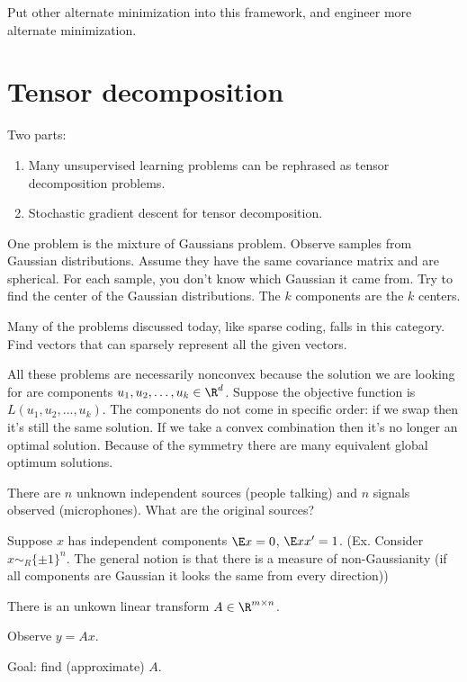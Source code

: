 Put other alternate minimization into this framework, and engineer more alternate minimization.


\section{Tensor decomposition}

Two parts:
\begin{enumerate}
\item
Many unsupervised learning problems can be rephrased as tensor decomposition problems. 
\item
Stochastic gradient descent for tensor decomposition.
\end{enumerate}

One problem is the mixture of Gaussians problem. Observe samples from Gaussian distributions. Assume they have the same covariance matrix and are spherical. For each sample, you don't know which Gaussian it came from. Try to find the center of the Gaussian distributions. The $k$ components are the $k$ centers. 

Many of the problems discussed today, like sparse coding, falls in this category. Find vectors that can sparsely represent all the given vectors.

All these problems are necessarily nonconvex because the solution we are looking for are components $u_1,u_2,\ldots, u_k\in \R^d$. Suppose the objective function is $L(u_1,u_2,\ldots, u_k)$. %
The components do not come in specific order: if we swap then it's still the same solution. If we take a convex combination then it's no longer an optimal solution. Because of the symmetry there are many equivalent global optimum solutions.


\begin{prb}
There are $n$ unknown independent sources (people talking) and $n$ signals observed (microphones). What are the original sources?

Suppose $x$ has independent components $\E x =0$, $\E xx'=1$. (Ex. Consider $x\sim_R \{\pm 1\}^n$. The general notion is that there is a measure of non-Gaussianity (if all components are Gaussian it looks the same from every direction))

There is an unkown linear transform $A\in \R^{m\times n}$. 

Observe $y=Ax$.

Goal: find (approximate) $A$.
\end{prb}

